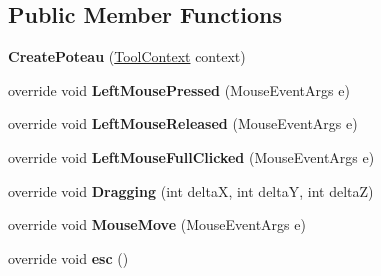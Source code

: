 \subsection*{Public Member Functions}
\begin{DoxyCompactItemize}
\item 
\hypertarget{class_interface_graphique_1_1_tools_1_1_create_poteau_a6828c36c0aaa7d27292254045a1b58f2}{}{\bfseries Create\+Poteau} (\hyperlink{class_interface_graphique_1_1_tools_1_1_tool_context}{Tool\+Context} context)\label{class_interface_graphique_1_1_tools_1_1_create_poteau_a6828c36c0aaa7d27292254045a1b58f2}

\item 
\hypertarget{class_interface_graphique_1_1_tools_1_1_create_poteau_a2e2251d85bed79c7b240fc3eb72a29be}{}override void {\bfseries Left\+Mouse\+Pressed} (Mouse\+Event\+Args e)\label{class_interface_graphique_1_1_tools_1_1_create_poteau_a2e2251d85bed79c7b240fc3eb72a29be}

\item 
\hypertarget{class_interface_graphique_1_1_tools_1_1_create_poteau_a1ddd68f567ccb4b8fc5fb06693ec85b1}{}override void {\bfseries Left\+Mouse\+Released} (Mouse\+Event\+Args e)\label{class_interface_graphique_1_1_tools_1_1_create_poteau_a1ddd68f567ccb4b8fc5fb06693ec85b1}

\item 
\hypertarget{class_interface_graphique_1_1_tools_1_1_create_poteau_a659960f2f85f7ff0ff64bd06d2e7cf9c}{}override void {\bfseries Left\+Mouse\+Full\+Clicked} (Mouse\+Event\+Args e)\label{class_interface_graphique_1_1_tools_1_1_create_poteau_a659960f2f85f7ff0ff64bd06d2e7cf9c}

\item 
\hypertarget{class_interface_graphique_1_1_tools_1_1_create_poteau_a30dcd71c461a1afc6fd4dd95c0e2a0ee}{}override void {\bfseries Dragging} (int delta\+X, int delta\+Y, int delta\+Z)\label{class_interface_graphique_1_1_tools_1_1_create_poteau_a30dcd71c461a1afc6fd4dd95c0e2a0ee}

\item 
\hypertarget{class_interface_graphique_1_1_tools_1_1_create_poteau_a11cb39fe881af64c1be87c44cc1c8306}{}override void {\bfseries Mouse\+Move} (Mouse\+Event\+Args e)\label{class_interface_graphique_1_1_tools_1_1_create_poteau_a11cb39fe881af64c1be87c44cc1c8306}

\item 
\hypertarget{class_interface_graphique_1_1_tools_1_1_create_poteau_a523af264dfe1487c08d1d73b309a1095}{}override void {\bfseries esc} ()\label{class_interface_graphique_1_1_tools_1_1_create_poteau_a523af264dfe1487c08d1d73b309a1095}

\end{DoxyCompactItemize}
